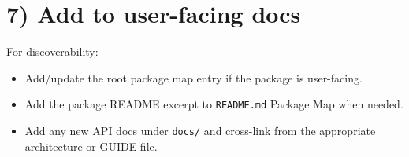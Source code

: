 \section{7) Add to user-facing docs}\label{record-011-add-to-user-facing-docs}

For discoverability:

\begin{itemize}
\tightlist
\item
  Add/update the root package map entry if the package is user-facing.
\item
  Add the package README excerpt to \texttt{R\allowbreak{}E\allowbreak{}A\allowbreak{}D\allowbreak{}M\allowbreak{}E\allowbreak{}.\allowbreak{}m\allowbreak{}d} Package Map when needed.
\item
  Add any new API docs under \texttt{d\allowbreak{}o\allowbreak{}c\allowbreak{}s\allowbreak{}/} and cross-link from the appropriate architecture or GUIDE file.
\end{itemize}

